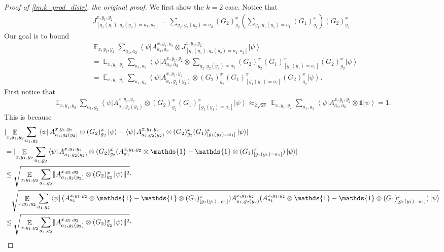 \documentclass[10pt,a4paper]{article}
\theoremstyle{plain}
\theoremstyle{definition}
\DeclarePairedDelimiter{\norm}{\lVert}{\rVert}
\DeclarePairedDelimiter{\abs}{\lvert}{\rvert}
\newcommand {\bra} [1] {\ensuremath{ \left\langle #1 \right| }}
\newcommand {\ket} [1] {\ensuremath{ \left| #1 \right\rangle }}
\DeclareMathOperator*{\bigE}{\mathbb{E}}
\newcommand {\id} {\ensuremath{\mathds{1}}}
\newcommand{\x}{\otimes}
\newcommand{\appd}[1]{\approx_{#1}}
\newcommand{\1}{\mathbb{1}} %
\begin{document}
\begin{proof}[Proof of \cref{lm:k_prod_distr}, the original proof]
	We first show the $k=2$ case. Notice that
	\begin{align*}
		J^{x,y_1,y_2}_{[g_1(y_1),g_2(y_2) = a_1, a_2]} = 
		\sum_{g_2: g_2(y_2)=a_2} (G_2)^x_{g_2} \left(\sum_{g_1: g_1(y_1) = a_1} (G_1)^x_{g_1}\right) (G_2)^x_{g_2}.
	\end{align*}
	Our goal is to bound
	\begin{align*}
		&\bigE_{x,y_1,y_2} \sum_{a_1, a_2} \bra{\psi} A^{x,y_1,y_2}_{a_1,a_2} \x J^{x,y_1,y_2}_{[g_1(y_1),g_2(y_2) = a_1, a_2]} \ket{\psi} \\
		&= \bigE_{x,y_1,y_2} \sum_{a_1, a_2} \bra{\psi} A^{x,y_1,y_2}_{a_1,a_2} \x 
		\sum_{g_2: g_2(y_2)=a_2} (G_2)^x_{g_2} (G_1)^x_{[g_1(y_1) = a_1]}(G_2)^x_{g_2} \ket{\psi} \\
		&=\bigE_{x,y_1,y_2} \sum_{a_1, g_2 }\bra{\psi} A^{x,y_1,y_2}_{a_1,g_2(y_2) } \x 
		 (G_2)^x_{g_2} (G_1)^x_{[g_1(y_1) = a_1]}(G_2)^x_{g_2} \ket{\psi}.
	\end{align*}
	First notice that 
	\begin{align*}
		\bigE_{x,y_1,y_2} \sum_{a_1, g_2 }\bra{\psi} A^{x,y_1,y_2}_{a_1 , g_2(y_2) } \x 
		 (G_2)^x_{g_2} (G_1)^x_{[g_1(y_1) = a_1]} \ket{\psi}
		 \appd{2\sqrt{2\delta}} 
		 \bigE_{x,y_1,y_2} \sum_{a_1, a_2} \bra{\psi} A^{x,y_1,y_2}_{a_1,a_2} \x \id \ket{\psi} = 1.
	\end{align*}
	This is because
	\begin{align*}
		&\abs{ \bigE_{x,y_1,y_2} \sum_{a_1, g_2 }\bra{\psi} A^{x,y_1,y_2}_{a_1, g_2(y_2) }  \x 
		 (G_2)^x_{g_2}  \ket{\psi} -
		  \bra{\psi} A^{x,y_1,y_2}_{a_1, g_2(y_2) } \x
		 (G_2)^x_{g_2} (G_1)^x_{[g_1(y_1) = a_1]} \ket{\psi}} \\
		& =  \abs{\bigE_{x,y_1,y_2}  \sum_{a_1, g_2} \bra{\psi} A^{x,y_1,y_2}_{a_1, g_2(y_2) } \x (G_2)^x_{g_2} 
		(A^{x,y_1,y_2}_{a_1} \x\id -\id\x(G_1)^x_{[g_1(y_1) = a_1]})\ket{\psi} }\\
		& \leq \sqrt{ \bigE_{x,y_1,y_2} \sum_{a_1, g_2} \norm{ A^{x,y_1,y_2}_{a_1, g_2(y_2) } \x (G_2)^x_{g_2} \ket{\psi}}^2} \cdot \\
		&\quad 
		\sqrt{\bigE_{x,y_1,y_2} \sum_{a_1, g_2} \bra{\psi} (A^{x,y_1,y_2}_{a_1} \x\id -\id\x(G_1)^x_{[g_1(y_1) = a_1]})  A^{x,y_1,y_2}_{a_1, g_2(y_2) }  (A^{x,y_1,y_2}_{a_1} \x\id -\id\x(G_1)^x_{[g_1(y_1) = a_1]})\ket{\psi}} \\
		& \leq \sqrt{ \bigE_{x,y_1,y_2} \sum_{a_1,g_2} \norm{ A^{x,y_1,y_2}_{a_1, g_2(y_2) } \x (G_2)^x_{g_2} \ket{\psi}}^2} \cdot \\

\end{align*}
\end{proof}
\end{document}
